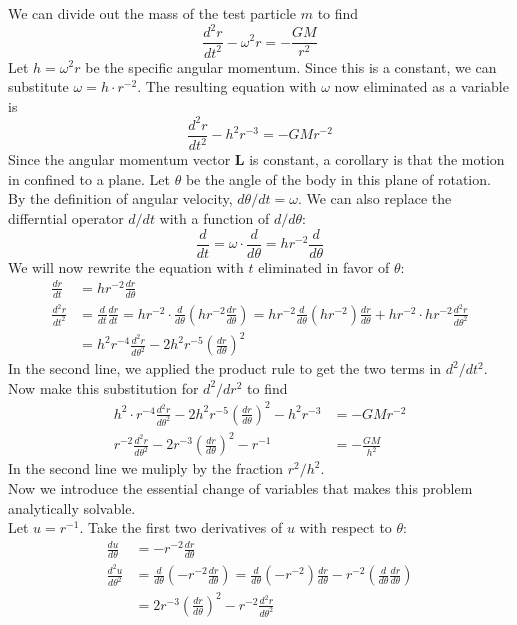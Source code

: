 We can divide out the mass of the test particle $m$ to find
$$ \frac{d^2r}{dt^2} - \omega^2 r = - \frac{G M }{r^2}$$
Let $h = \omega^2 r$ be the specific angular momentum.
Since this is a constant, we can substitute $\omega = h\cdot r^{-2}$.  
The resulting equation with $\omega$ now eliminated as a variable is
$$ \frac{d^2r}{dt^2} - h^2 r^{-3} = - G Mr^{-2}$$
Since the angular momentum vector $\mathbf{L}$ is constant, a corollary is that the motion in confined to a plane.
Let $\theta$ be the angle of the body in this plane of rotation.
By the definition of angular velocity, $d\theta / dt = \omega$.
We can also replace the differntial operator $d / dt$ with a function of $d / d\theta$:
$$\frac{d}{dt} = \omega \cdot \frac{d}{d\theta} = h r^{-2} \frac{d}{d\theta}$$
We will now rewrite the equation with $t$ eliminated in favor of $\theta$:
\begin{align*}
\frac{dr}{dt} &= hr^{-2} \frac{dr}{d\theta} \\
\frac{d^2r}{dt^2} &= \frac{d}{dt} \frac{dr}{dt} = hr^{-2} \cdot \frac{d}{d\theta} \left( hr^{-2} \frac{dr}{d\theta} \right)
= hr^{-2} \frac{d}{d\theta} \left(hr^{-2}\right) \frac{dr}{d\theta}  + hr^{-2} \cdot hr^{-2} \frac{d^2r}{d\theta^2} \\
&= h^2 r^{-4} \frac{d^2r}{d\theta^2} - 2h^2 r^{-5} \left( \frac{dr}{d\theta} \right)^2
\end{align*}
In the second line, we applied the product rule to get the two terms in $d^2 / dt^2$.\\
Now make this substitution for $d^2/ dr^2$ to find
\begin{align*}
h^2 \cdot r^{-4} \frac{d^2r}{d\theta^2} - 2h^2 r^{-5} \left(\frac{dr}{d\theta}\right)^2 - h^2r^{-3} &= -GMr^{-2} \\
r^{-2} \frac{d^2r}{d\theta^2} - 2 r^{-3} \left(\frac{dr}{d\theta}\right)^2 - r^{-1} &= -\frac{GM}{h^2}
\end{align*}
In the second line we muliply by the fraction $r^2 / h^2$.\\
Now we introduce the essential change of variables that makes this problem analytically solvable.\\
Let $u = r^{-1}$.  Take the first two derivatives of $u$ with respect to $\theta$:
\begin{align*}
\frac{du}{d\theta} &= -r^{-2} \frac{dr}{d\theta} \\
\frac{d^2u}{d\theta^2} &= \frac{d}{d\theta} \left( -r^{-2} \frac{dr}{d\theta} \right) = 
\frac{d}{d\theta} \left( -r^{-2} \right)\frac{dr}{d\theta} -r^{-2} \left( \frac{d}{d\theta}   \frac{dr}{d\theta} \right) \\
&= 2r^{-3} \left(\frac{dr}{d\theta}\right)^{2} - r^{-2} \frac{d^2r}{d\theta^2}
\end{align*}
